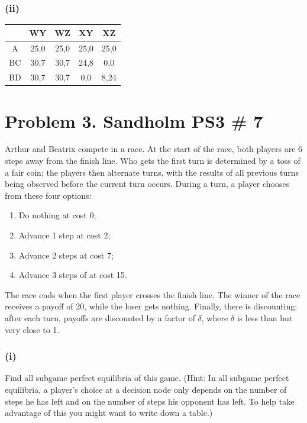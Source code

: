 \documentclass[10pt, a4paper]{article}
\begin{document}
    \subsubsection*{(ii)}
      \begin{center}
        \begin{tabular}{|c|c|c|c|c|}
            \hline
          & WY & WZ & XY & XZ \\
          \hline
          A & 25,0 & 25,0 & 25,0 & 25,0 \\
          \hline
          BC & 30,7 & 30,7 & 24,8 & 0,0 \\
          \hline
          BD & 30,7 & 30,7 & 0,0 & 8,24 \\
          \hline
        \end{tabular}
      \end{center}
\section*{Problem 3. Sandholm PS3 \# 7}
  Arthur and Beatrix compete in a race. At the start of the race, both players are 6 steps away from the finish line. Who gets the first turn is determined by a toss of a fair coin; the players then alternate turns, with the results of all previous turns being observed before the current turn occurs.
  During a turn, a player chooses from these four options:
  \begin{enumerate}
    \item Do nothing at cost 0;
    \item Advance 1 step at cost 2;
    \item Advance 2 steps at cost 7;
    \item Advance 3 steps of at cost 15.
  \end{enumerate}
  The race ends when the first player crosses the finish line. The winner of the race receives a payoff of 20, while the loser gets nothing. Finally, there is discounting: after each turn, payoffs are discounted by a factor of $\delta$, where $\delta$ is less than but very close to 1.
  \subsubsection*{(i)}
  Find all subgame perfect equilibria of this game. (Hint: In all subgame perfect equilibria, a player's choice at a decision node only depends on the number of steps he has left and on the number of steps his opponent has left. To help take advantage of this you might want to write down a table.)
\end{document}
